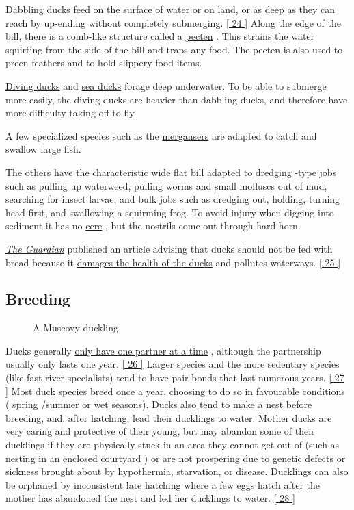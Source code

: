 \documentclass[11pt,a4paper]{article}
\begin{document}
\href{/wiki/Dabbling\_duck}{Dabbling ducks} feed on the surface of water or on land, or as deep as they can reach by up-ending without completely submerging. \href{\#cite\_note-24}{[ 24 ]} Along the edge of the bill, there is a comb-like structure called a \href{/wiki/Pecten\_\%28biology\%29}{pecten} . This strains the water squirting from the side of the bill and traps any food. The pecten is also used to preen feathers and to hold slippery food items.

\href{/wiki/Diving\_duck}{Diving ducks} and \href{/wiki/Sea\_duck}{sea ducks} forage deep underwater. To be able to submerge more easily, the diving ducks are heavier than dabbling ducks, and therefore have more difficulty taking off to fly.

A few specialized species such as the \href{/wiki/Merganser}{mergansers} are adapted to catch and swallow large fish.

The others have the characteristic wide flat bill adapted to \href{/wiki/Dredging}{dredging} -type jobs such as pulling up waterweed, pulling worms and small molluscs out of mud, searching for insect larvae, and bulk jobs such as dredging out, holding, turning head first, and swallowing a squirming frog. To avoid injury when digging into sediment it has no \href{/wiki/Cere}{cere} , but the nostrils come out through hard horn.

\href{/wiki/The\_Guardian}{\textit{The Guardian}} published an article advising that ducks should not be fed with bread because it \href{/wiki/Angel\_wing}{damages the health of the ducks} and pollutes waterways. \href{\#cite\_note-25}{[ 25 ]}

\subsection{Breeding}

\begin{figure}[h]
\caption{A Muscovy duckling}
\end{figure}

Ducks generally \href{/wiki/Monogamy\_in\_animals}{only have one partner at a time} , although the partnership usually only lasts one year. \href{\#cite\_note-26}{[ 26 ]} Larger species and the more sedentary species (like fast-river specialists) tend to have pair-bonds that last numerous years. \href{\#cite\_note-27}{[ 27 ]} Most duck species breed once a year, choosing to do so in favourable conditions ( \href{/wiki/Spring\_\%28season\%29}{spring} /summer or wet seasons). Ducks also tend to make a \href{/wiki/Bird\_nest}{nest} before breeding, and, after hatching, lead their ducklings to water. Mother ducks are very caring and protective of their young, but may abandon some of their ducklings if they are physically stuck in an area they cannot get out of (such as nesting in an enclosed \href{/wiki/Courtyard}{courtyard} ) or are not prospering due to genetic defects or sickness brought about by hypothermia, starvation, or disease. Ducklings can also be orphaned by inconsistent late hatching where a few eggs hatch after the mother has abandoned the nest and led her ducklings to water. \href{\#cite\_note-28}{[ 28 ]}
\end{document}
